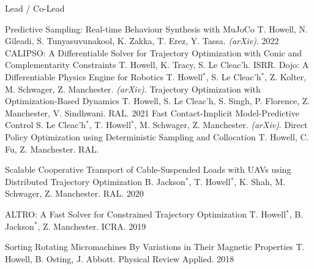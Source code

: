 

\begin{center} \small{Lead / Co-Lead} \end{center}
\begin{cvhonors}

	\cvhonor
	{Predictive Sampling: Real-time Behaviour Synthesis with MuJoCo} %
	{T. Howell, N. Gileadi, S. Tunyasuvunakool, K. Zakka, T. Erez, Y. Tassa. \textit{(arXiv)}.} %
	{}
	{2022} %
	\cvhonor
	{CALIPSO: A Differentiable Solver for Trajectory Optimization with Conic and Complementarity Constraints} %
	{T. Howell, K. Tracy, S. Le Cleac'h. ISRR.} %
	{}
	{} %
	\cvhonor
	{Dojo: A Differentiable Physics Engine for Robotics} %
	{T. Howell$^*$, S. Le Cleac'h$^*$, Z. Kolter, M. Schwager, Z. Manchester. \textit{(arXiv)}.} %
	{}
	{} %
   \cvhonor
	{Trajectory Optimization with Optimization-Based Dynamics} %
	{T. Howell, S. Le Cleac'h, S. Singh, P. Florence, Z. Manchester, V. Sindhwani. RAL.} %
	{}
	{2021} %
   \cvhonor
	{Fast Contact-Implicit Model-Predictive Control} %
	{S. Le Cleac'h$^*$, T. Howell$^*$, M. Schwager, Z. Manchester. \textit{(arXiv)}.} %
	{}
	{} %
  \cvhonor
    {Direct Policy Optimization using Deterministic Sampling and Collocation} %
    {T. Howell, C. Fu, Z. Manchester. RAL.} %
    {}
    {} %
    
  \cvhonor
    {Scalable Cooperative Transport of Cable-Suspended Loads with UAVs using Distributed Trajectory Optimization} %
    {B. Jackson$^*$, T. Howell$^*$, K. Shah, M. Schwager, Z. Manchester. RAL.} %
    {}
    {2020} %
    
  \cvhonor
    {ALTRO: A Fast Solver for Constrained Trajectory Optimization}
    {T. Howell$^*$, B. Jackson$^*$, Z. Manchester. ICRA.}
    {}
    {2019}
    
  \cvhonor
    {Sorting Rotating Micromachines By Variations in Their Magnetic Properties}
    {T. Howell, B. Osting, J. Abbott. Physical Review Applied.} 
    {}
    {2018}
    
\end{cvhonors}

